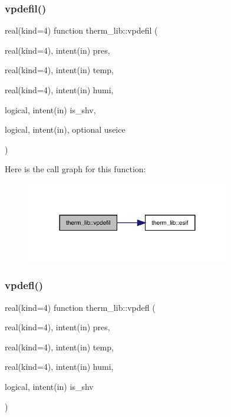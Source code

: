 \subsubsection{\texorpdfstring{vpdefil()}{vpdefil()}}
{\footnotesize\ttfamily real(kind=4) function therm\+\_\+lib\+::vpdefil (\begin{DoxyParamCaption}\item[{real(kind=4), intent(in)}]{pres,  }\item[{real(kind=4), intent(in)}]{temp,  }\item[{real(kind=4), intent(in)}]{humi,  }\item[{logical, intent(in)}]{is\+\_\+shv,  }\item[{logical, intent(in), optional}]{useice }\end{DoxyParamCaption})}

Here is the call graph for this function\+:
\nopagebreak
\begin{figure}[H]
\begin{center}
\leavevmode
\includegraphics[width=252pt]{namespacetherm__lib_af6ca165844a5da4f2d21a37aa3fff081_cgraph}
\end{center}
\end{figure}
\mbox{\label{namespacetherm__lib_a6f84a6e1d410eb7f89dd59a9f6a13f3b}} 
\subsubsection{\texorpdfstring{vpdefl()}{vpdefl()}}
{\footnotesize\ttfamily real(kind=4) function therm\+\_\+lib\+::vpdefl (\begin{DoxyParamCaption}\item[{real(kind=4), intent(in)}]{pres,  }\item[{real(kind=4), intent(in)}]{temp,  }\item[{real(kind=4), intent(in)}]{humi,  }\item[{logical, intent(in)}]{is\+\_\+shv }\end{DoxyParamCaption})}

